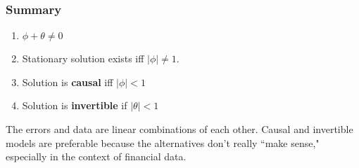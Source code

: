 \documentclass{beamer}
\begin{document}
\begin{frame}
\frametitle{Summary}

\begin{enumerate}
\item $\phi + \theta \neq 0$
\item Stationary solution exists iff $|\phi| \neq 1$.
\item Solution is {\bf causal} iff $|\phi| < 1$
\item Solution is {\bf invertible} if $|\theta| < 1$
\end{enumerate}

The errors and data are linear combinations of each other. Causal and invertible models are preferable because the alternatives don't really ``make sense," especially in the context of financial data.

\end{frame}
\end{document}
